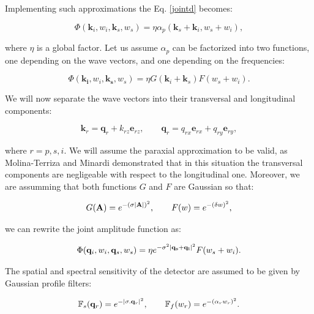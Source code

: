 \documentclass[12pt]{book}
\begin{document}
Implementing such approximations the Eq. \ref{jointd} becomes:

\begin{equation}
\Phi(\mathbf{k}_{i},w_{i},\mathbf{k}_{s},w_{s})= \eta \alpha_{p}(\mathbf{k}_{s}+\mathbf{k}_{i},w_{s}+w_{i}) ,
\end{equation}


where $\eta$ is a global factor. Let us assume  $\alpha_{p}$ can be factorized into two functions, one depending on the wave vectors, and one depending on the frequencies:

\begin{equation}
\Phi(\mathbf{k_{i}},w_{i},\mathbf{k_{s}},w_{s})= \eta G(\mathbf{k}_{i}+\mathbf{k}_{s}) F(w_{s}+w_{i}) .
\end{equation}
 
We  will now separate the wave vectors into their transversal and longitudinal components:

\begin{equation}
\mathbf{k}_{r}=\mathbf{q}_{r}+k_{rz} \mathbf{e}_{rz},\qquad \mathbf{q}_{r}=q_{rx} \mathbf{e}_{rx}+q_{ry} \mathbf{e}_{ry},
\end{equation}

where $r=p, s, i$. We will assume the paraxial approximation to be valid,  as Molina-Terriza and Minardi \cite{minardi} demonstrated that in this situation the transversal components are negligeable with respect to the longitudinal one. Moreover, we are assumming that both functions $G$ and $F$ are Gaussian so that:

\begin{equation}
G(\mathbf{A})=e^{- (\sigma \abs{\mathbf{A}})^{2} },\qquad F(w)=e^{-(\delta w)^2},
\end{equation}

we can rewrite the joint amplitude function as:

\begin{equation}
\Phi(\mathbf{q}_{i},w_{i},\mathbf{q}_{s},w_{s})= \eta e^{-\sigma^{2}\abs{\mathbf{q_{s}}+\mathbf{q_{i}}}^{2}} F(w_{s}+w_{i}).\label{true}
\end{equation}

The spatial and spectral sensitivity of the detector are assumed to be given by Gaussian profile filters:

\begin{equation}
\mathbb{F}_{s}(\mathbf{q}_{r})=e^{-\abs{\mathbf{\sigma}.\mathbf{q}_{r}}^{2}},\qquad \mathbb{F}_{f}(w_{r})=e^{-(\alpha_{r} w_{r})^{2}}. \label{filter}
\end{equation}
\end{document}
